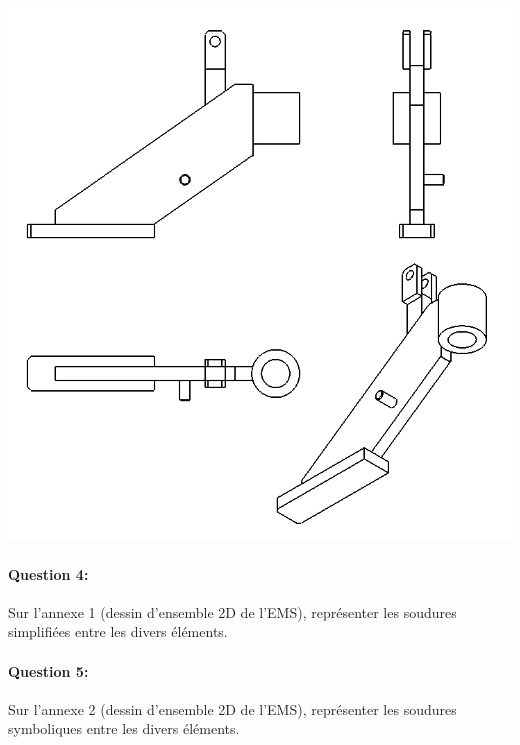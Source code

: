 \begin{center}
 \includegraphics[width=0.9\linewidth]{img/dessin.png}
\end{center}

\paragraph{Question 4:} Sur l'annexe 1 (dessin d'ensemble 2D de l'EMS), représenter les soudures simplifiées entre les divers éléments.

\paragraph{Question 5:} Sur l'annexe 2 (dessin d'ensemble 2D de l'EMS), représenter les soudures symboliques entre les divers éléments.

%
%
%

\newpage





